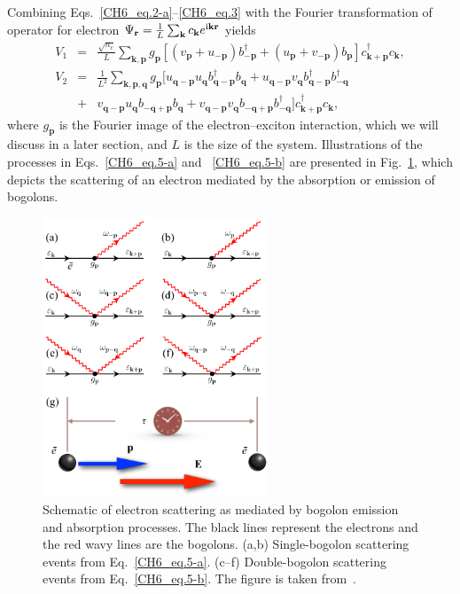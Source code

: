 %
Combining Eqs.~\eqref{CH6_eq.2-a}--\eqref{CH6_eq.3} with the Fourier transformation of operator for electron $\Psi_\mathbf{r}=\frac{1}{L}\sum_\mathbf{k} c_\mathbf{k} e^{\mathrm{i}\mathbf{k}\mathbf{r}}$ yields
%
\begin{eqnarray}
V_1 &=& \frac{\sqrt{n_c}}{L} \sum_{\mathbf{k,p}} g_\mathbf{p} \left[ \left( v_\mathbf{p} + u_\mathbf{-p} \right)b^\dagger_\mathbf{-p} + \left( u_\mathbf{p} + v_\mathbf{-p}\right)b_\mathbf{p} \right] c^\dagger_\mathbf{k+p} c_\mathbf{k}, \label{CH6_eq.5-a} \\
V_2 &=& \frac{1}{L^2}\sum_{\mathbf{k},\mathbf{p},\mathbf{q}} g_\mathbf{p}\bigg[ u_{\mathbf{q}-\mathbf{p}} u_\mathbf{q} b^\dagger_{\mathbf{q}-\mathbf{p}} b_\mathbf{q} + u_{\mathbf{q}-\mathbf{p}} v_\mathbf{q} b^\dagger_{\mathbf{q}-\mathbf{p}} b^\dagger_{-\mathbf{q}} \nonumber \\
&+& v_{\mathbf{q}-\mathbf{p}} u_\mathbf{q} b_{-\mathbf{q}+\mathbf{p}} b_\mathbf{q} + v_{\mathbf{q}-\mathbf{p}} v_\mathbf{q} b_{-\mathbf{q}+\mathbf{p}} b^\dagger_{-\mathbf{q}}\bigg] c^\dagger_{\mathbf{k}+\mathbf{p}} c_\mathbf{k},\label{CH6_eq.5-b}
\end{eqnarray}
%
where $g_\mathbf{p}$ is the Fourier image of the electron--exciton interaction, which we will discuss in a later section, and $L$ is the size of the system.
%
Illustrations of the processes in Eqs.~\eqref{CH6_eq.5-a} and ~\eqref{CH6_eq.5-b} are presented in Fig.~\ref{fig:CH6_2}, which depicts the scattering of an electron mediated by the absorption or emission of bogolons.
%
%
%
\begin{figure}[ht]
    \centering
    \includegraphics[width=0.60\textwidth]{Fig/Ch6/Fig2.pdf}
    \caption[Electron scattering diagrams]{Schematic of electron scattering as mediated by bogolon emission and absorption processes. The black lines represent the electrons and the red wavy lines are the bogolons. (a,b) Single-bogolon scattering events from Eq.~\eqref{CH6_eq.5-a}. (c--f) Double-bogolon scattering events from Eq.~\eqref{CH6_eq.5-b}. The figure is taken from~\cite{Villegas:2019aa}.}
    \label{fig:CH6_2}
\end{figure}
%
%
%

